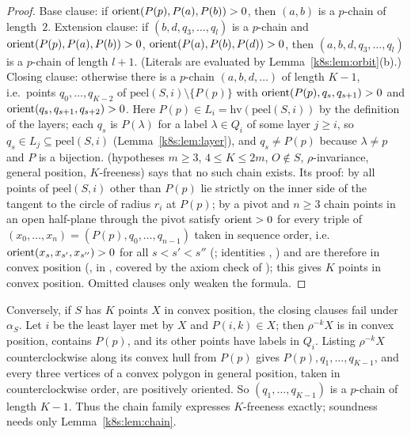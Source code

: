 \begin{proof}
Base clause: if $\operatorname{orient}(P(p),P(a),P(b))>0$, then $(a,b)$ is a $p$-chain of length~$2$. Extension clause: if
$(b,d,q_3,\dots,q_l)$ is a $p$-chain and $\operatorname{orient}(P(p),P(a),P(b))>0$, $\operatorname{orient}(P(a),P(b),P(d))>0$, then
$(a,b,d,q_3,\dots,q_l)$ is a $p$-chain of length $l+1$. (Literals are evaluated by Lemma~\ref{k8s:lem:orbit}(b).)
Closing clause: otherwise there is a $p$-chain $(a,b,d,\dots)$ of length $K-1$, i.e.\ points $q_0,\dots,q_{K-2}$ of
$\mathrm{peel}(S,i)\setminus\{P(p)\}$ with $\operatorname{orient}(P(p),q_s,q_{s+1})>0$ and $\operatorname{orient}(q_s,q_{s+1},q_{s+2})>0$. Here
$P(p)\in L_i=\mathrm{hv}(\mathrm{peel}(S,i))$ by the definition of the layers; each $q_s$ is $P(\lambda)$ for a label
$\lambda\in Q_i$ of some layer $j\ge i$, so $q_s\in L_j\subseteq\mathrm{peel}(S,i)$ (Lemma~\ref{k8s:lem:layer}), and
$q_s\ne P(p)$ because $\lambda\ne p$ and $P$ is a bijection.  (hypotheses
$m\ge3$, $4\le K\le2m$, $O\notin S$, $\rho$-invariance, general position, $K$-freeness) says that no such chain exists.
Its proof: by  all points of $\mathrm{peel}(S,i)$ other than $P(p)$ lie strictly on the inner side of
the tangent to the circle of radius $r_i$ at $P(p)$; by  a pivot and $n\ge3$ chain points in an
open half-plane through the pivot satisfy $\operatorname{orient}>0$ for every triple of $(x_0,\dots,x_n)=(P(p),q_0,\dots,q_{n-1})$
taken in sequence order, i.e.\ $\operatorname{orient}(x_s,x_{s'},x_{s''})>0$ for all $s<s'<s''$ (; identities
, ) and are therefore in convex position
(, in ,
covered by the axiom check of ); this gives $K$ points in convex position. Omitted
clauses only weaken the formula.
\end{proof}

\begin{remark}\label{k8s:rem:complete}
Conversely, if $S$ has $K$ points $X$ in convex position, the closing clauses fail under $\alpha_S$. Let $i$ be the least
layer met by $X$ and $P(i,k)\in X$; then $\rho^{-k}X$ is in convex position, contains $P(p)$, and its other points have
labels in $Q_i$. Listing $\rho^{-k}X$ counterclockwise along its convex hull from $P(p)$ gives $P(p),q_1,\dots,q_{K-1}$,
and every three vertices of a convex polygon in general position, taken in counterclockwise order, are positively
oriented. So $(q_1,\dots,q_{K-1})$ is a $p$-chain of length $K-1$. Thus the chain family expresses $K$-freeness exactly;
soundness needs only Lemma~\ref{k8s:lem:chain}.
\end{remark}

